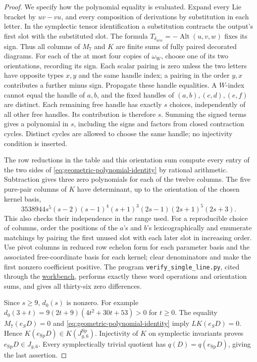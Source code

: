 \documentclass[11pt]{article}
\theoremstyle{definition}\newtheorem{definition}[theorem]{Definition}
\newcommand{\workbenchurl}{https://github.com/KokunoYumeto/k-theory-and-galois-groups-workbench}
\begin{document}
\begin{proof}
We specify how the polynomial equality is evaluated.
Expand every Lie bracket by $uv-vu$, and every composition
of derivations by substitution in each letter. In the
symplectic tensor identification a substitution contracts
the output's first slot with the substituted slot. The
formula $T_{\delta_{uvw}}=-\operatorname{Alt}(u,v,w)$
fixes its sign. Thus all columns of $M_7$ and $K$ are
finite sums of fully paired decorated diagrams.
For each of the at most four copies of $\omega_W$, choose
one of its two orientations, recording its sign.
Each scalar pairing is zero unless the two letters have
opposite types $x,y$ and the same handle index; a pairing
in the order $y,x$ contributes a further minus sign.
Propagate these handle equalities. A $W$-index cannot
equal the handle of $a,b$, and the fixed handles of
$(a,b),(c,d),(e,f)$ are distinct. Each remaining free
handle has exactly $s$ choices, independently of all
other free handles. Its contribution is therefore $s$.
Summing the signed terms gives a polynomial in $s$,
including the signs and factors from closed contraction
cycles. Distinct cycles are allowed to choose the same
handle; no injectivity condition is inserted.

The row reductions in the table and this orientation
sum compute every entry of the two sides of
\eqref{eq:geometric-polynomial-identity} by rational
arithmetic. Subtraction gives three zero polynomials
for each of the twelve columns. The five pure-pair
columns of $K$ have determinant, up to the orientation
of the chosen kernel basis,
\[
 3538944s^5(s-2)(s-1)^4(s+1)^3
             (2s-1)(2s+1)^5(2s+3).
\]
This also checks their independence in the range used.
For a reproducible choice of columns, order the positions
of the $a$'s and $b$'s lexicographically and enumerate
matchings by pairing the first unused slot with each
later slot in increasing order. Use pivot columns in
reduced row echelon form for each parameter basis and
the associated free-coordinate basis for each kernel;
clear denominators and make the first nonzero coefficient
positive. The program \texttt{verify\_single\_line.py},
cited through the \href{\workbenchurl}{workbench},
performs exactly these word operations and orientation
sums, and gives all thirty-six zero differences.

Since $s\geq9$, $d_0(s)$ is nonzero. For example
$d_0(3+t)=9(2t+9)(4t^2+30t+53)>0$ for $t\geq0$.
The equality $M_7(e_SD)=0$ and
\eqref{eq:geometric-polynomial-identity} imply
$LK(e_SD)=0$. Hence
$K(e_{\operatorname{Sp}}D)\in K(J_{g,6}^{\operatorname{Sp}})$.
Injectivity of $K$ on symplectic invariants proves
$e_{\operatorname{Sp}}D\in J_{g,6}$.
Every symplectically trivial quotient has
$q(D)=q(e_{\operatorname{Sp}}D)$, giving the last assertion.
\end{proof}
\end{document}
